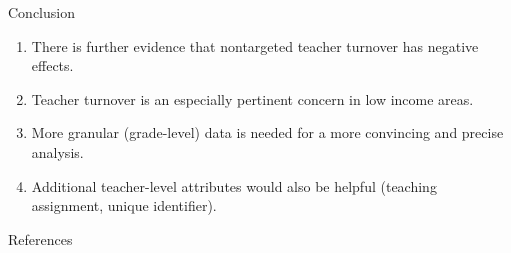 \documentclass[notes]{beamer}
\begin{document}
\begin{frame}{Conclusion}
\begin{enumerate}[I]
    \item There is further evidence that nontargeted teacher turnover has negative effects.
    \item Teacher turnover is an especially pertinent concern in low income areas.
    \item More granular (grade-level) data is needed for a more convincing and precise analysis.
    \item Additional teacher-level attributes would also be helpful (teaching assignment, unique identifier).
\end{enumerate}
    
\end{frame}





\begingroup
\tiny
\begin{frame}{References}
\nocite{*}


\end{frame}
\endgroup
\end{document}
